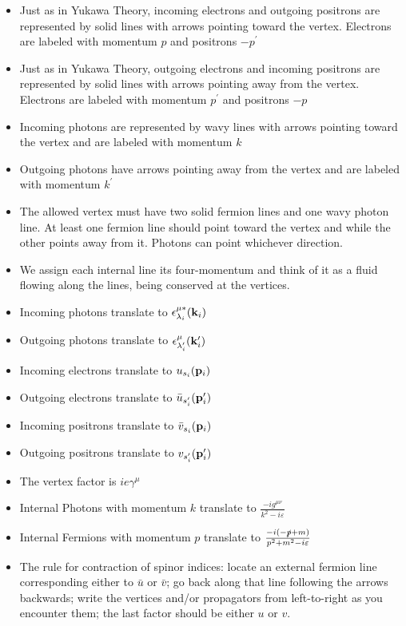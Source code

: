 \begin{itemize}
    \item Just as in Yukawa Theory, incoming electrons and outgoing positrons are represented by solid lines with arrows pointing toward the vertex. Electrons are labeled with momentum $p$ and positrons $-p^\prime$
    \item Just as in Yukawa Theory, outgoing electrons and incoming positrons are represented by solid lines with arrows pointing away from the vertex. Electrons are labeled with momentum $p^\prime$ and positrons $-p$
    \item Incoming photons are represented by wavy lines with arrows pointing toward the vertex and are labeled with momentum $k$
    \item Outgoing photons have arrows pointing away from the vertex and are labeled with momentum $k^\prime$
    \item The allowed vertex must have two solid fermion lines and one wavy photon line. At least one fermion line should point toward the vertex and while the other points away from it. Photons can point whichever direction. 
    \item We assign each internal line its four-momentum and think of it as a fluid flowing along the lines, being conserved at the vertices.
    \item Incoming photons translate to $\epsilon^{\mu*}_{\lambda_i}(\vb{k}_i)$
    \item Outgoing photons translate to $\epsilon^{\mu}_{\lambda_{i}^\prime}(\vb{k}_i^\prime)$
    \item Incoming electrons translate to $u_{s_i}(\vb{p}_i)$
    \item Outgoing electrons translate to $\bar{u}_{s_{i}^\prime}(\vb{p}_i^\prime)$
    \item Incoming positrons translate to $\bar{v}_{s_{i}}(\vb{p}_i)$
    \item Outgoing positrons translate to ${v}_{s_{i}^\prime}(\vb{p}_i^\prime)$
    \item The vertex factor is $ie\gamma^\mu$
    \item Internal Photons with momentum $k$ translate to $\frac{-ig^{\mu\nu}}{k^2-i\varepsilon}$
    \item Internal Fermions with momentum $p$ translate to
    $\frac{-i(-\slashed{p}+m)}{p^2+m^2-i\varepsilon}$
    \item The rule for contraction of spinor indices: locate an external fermion line corresponding either to $\bar{u}$ or $\bar{v}$; go back along that line following the arrows backwards; write the vertices and/or propagators from left-to-right as you encounter them; the last factor should be either $u$ or $v$.

\end{itemize}

